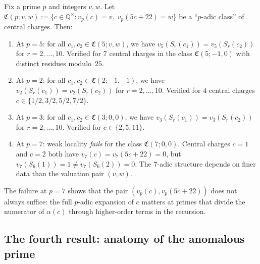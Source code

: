 \documentclass[11pt]{article}
\newcommand{\Q}{\mathbb{Q}}
\begin{document}
\begin{proposition}
\label{prop:weak-p-adic-locality}
Fix a prime $p$ and integers $v, w$.
Let $\mathfrak{C}(p; v, w) := \{c \in \Q^\times : v_p(c) = v,\;
v_p(5c+22) = w\}$ be a ``$p$-adic class'' of central charges.
Then:
\begin{enumerate}[label=\textup{(\roman*)}]
\item At $p = 5$: for all $c_1, c_2 \in \mathfrak{C}(5; v, w)$,
  we have $v_5(S_r(c_1)) = v_5(S_r(c_2))$ for $r = 2, \ldots, 10$.
  Verified for $7$ central charges in the class $\mathfrak{C}(5;
  -1, 0)$ with distinct residues modulo~$25$.

\item At $p = 2$: for all
  $c_1, c_2 \in \mathfrak{C}(2; -1, -1)$,
  we have $v_2(S_r(c_1)) = v_2(S_r(c_2))$ for $r = 2, \ldots,
  10$.  Verified for $4$ central charges $c \in \{1/2, 3/2,
  5/2, 7/2\}$.

\item At $p = 3$: for all
  $c_1, c_2 \in \mathfrak{C}(3; 0, 0)$,
  we have $v_3(S_r(c_1)) = v_3(S_r(c_2))$ for
  $r = 2, \ldots, 10$.  Verified for $c \in \{2, 5, 11\}$.

\item At $p = 7$: weak locality \emph{fails} for the class
  $\mathfrak{C}(7; 0, 0)$.  Central charges $c = 1$ and $c = 2$
  both have $v_7(c) = v_7(5c+22) = 0$, but
  $v_7(S_6(1)) = 1 \ne v_7(S_6(2)) = 0$.  The $7$-adic structure
  depends on finer data than the valuation pair $(v, w)$.
\end{enumerate}
\end{proposition}

The failure at $p = 7$ shows that the pair
$(v_p(c), v_p(5c+22))$ does not always suffice: the
full $p$-adic expansion of $c$ matters at primes that divide
the numerator of $\alpha(c)$ through higher-order terms in the
recursion.

\subsection*{The fourth result: anatomy of the anomalous prime}
\end{document}

